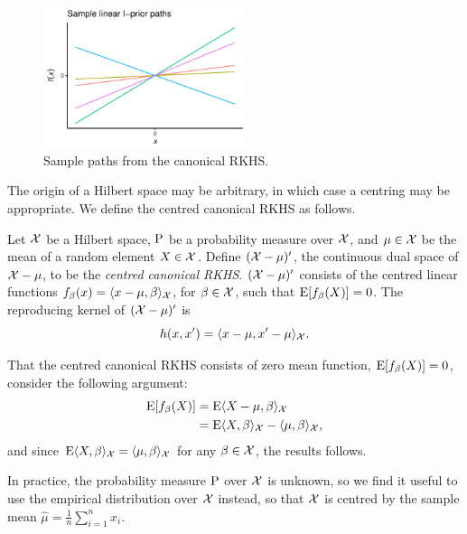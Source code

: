 \begin{figure}[H]
  \centering
  \includegraphics[width=0.53\textwidth]{figure/02-kernel_path_canonical}
  \caption{Sample paths from the canonical RKHS.}
\end{figure}

The origin of a Hilbert space may be arbitrary, in which case a centring may be appropriate.
We define the centred canonical RKHS as follows.

\begin{definition}
  Let ${\mathcal X}$ be a Hilbert space, $\operatorname{P}$ be a probability measure over ${\mathcal X}$, and $\mu\in{\mathcal X}$ be the mean of a random element $X\in{\mathcal X}$. 
  Define $({\mathcal X} - \mu)'$, the continuous dual space of ${\mathcal X} - \mu$, to be the \emph{centred canonical RKHS}.
  $({\mathcal X} - \mu)'$ consists of the centred linear functions $f_\beta(x)=\langle x-\mu,\beta\rangle_{\mathcal X}$, for $\beta\in{\mathcal X}$, such that $\operatorname{E} [f_\beta(X)] = 0$.
  The reproducing kernel of $({\mathcal X} - \mu)'$ is
  \[
    h(x,x') = \langle x-\mu,x'-\mu\rangle_{\mathcal X}.
  \]
\end{definition}

That the centred canonical RKHS consists of zero mean function, $\operatorname{E} [f_\beta(X)] = 0$, consider the following argument:
\vspace{-0.5em}
\begin{align*}
  \E [f_\beta(X)] 
  &= \E \ip{X-\mu,\beta}_\cX \\
  &= \E \ip{X,\beta}_\cX - \ip{\mu,\beta}_\cX, \vspace{-0.5em}
\end{align*}
and since $\operatorname{E} \langle X,\beta\rangle_{\mathcal X} = \langle\mu,\beta\rangle_{\mathcal X}$ for any $\beta\in{\mathcal X}$, the results follows.

\begin{remark}\label{rem:empircent}
  In practice, the probability measure $\operatorname{P}$ over ${\mathcal X}$ is unknown, so we find it useful to use the empirical distribution over ${\mathcal X}$ instead, so that ${\mathcal X}$ is centred by the sample mean $\hat\mu = \frac{1}{n}\sum_{i=1}^n x_i$.  
\end{remark}

